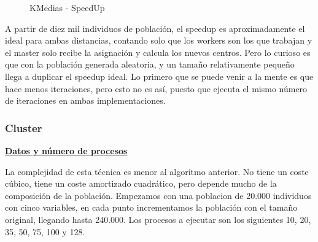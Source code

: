 			\begin{figure}[!h]
			\centering
			\caption{KMedias - SpeedUp}
			\end{figure}
			
			A partir de diez mil individuos de población, el speedup es aproximadamente el ideal para ambas distancias, contando solo que los workers son los que trabajan y el master solo recibe la asignación y calcula los nuevos centros. Pero lo curioso es que con la población generada aleatoria, y un tamaño relativamente pequeño llega a duplicar el speedup ideal. Lo primero que se puede venir a la mente es que hace menos iteraciones, pero esto no es así, puesto que ejecuta el mismo número de iteraciones en ambas implementaciones. 
			
			
			
		
			
					
		\subsubsection{Cluster}
		
			\begin{flushleft}
			\begin{mdframed}[roundcorner=5pt]			
				\textbf{\underline{Datos y número de procesos}}
				\vspace{0.1cm}
				
				\scriptsize	
				La complejidad de esta técnica es menor al algoritmo anterior. No tiene un coste cúbico, tiene un coste amortizado cuadrático, pero depende mucho de la composición de la población. Empezamos con una poblacion de 20.000 individuos con cinco variables, en cada punto incrementamos la población con el tamaño original, llegando hasta 240.000. Los procesos a ejecutar son los siguientes 10, 20, 35, 50, 75, 100 y 128.
			\end{mdframed}
			\end{flushleft}	

